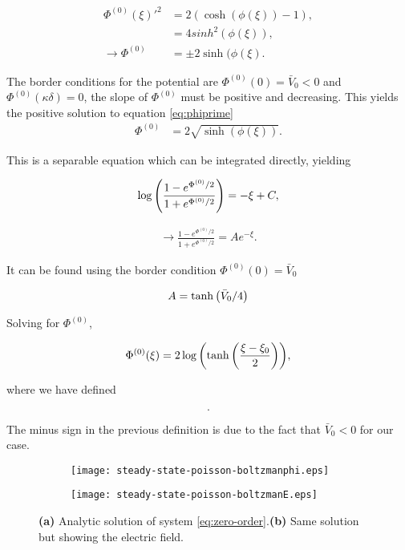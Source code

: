 \begin{align}
\Phi^{(0)}(\xi)'^2   &= 2(\cosh(\phi(\xi))-1),\\
&= 4sinh^2(\phi(\xi)), \\
\rightarrow \Phi^{(0)} &= \pm 2\sinh(\phi(\xi).
\label{eq:phiprime}
\end{align}


The border conditions for the potential are $\Phi^{(0)}(0) = \bar{V}_0<0$ and $\Phi^{(0)}(\kappa \delta) = 0$, the slope of $\Phi^{(0)}$ must be positive and decreasing. This yields the positive solution to equation \ref{eq:phiprime}
\begin{align}
\Phi^{(0)} &=  2\sqrt{\sinh(\phi(\xi))}.
\end{align}

This is a separable equation which can be integrated directly, yielding

\begin{align}
	\log\left({\frac{1-e^{\Phi^{(0)}/2}}{1+e^{\Phi^{(0)}/2}}}\right) = -\xi + C,
\end{align}

\begin{align}
	\rightarrow \frac{1-e^{\Phi^{(0)}/2}}{1+e^{\Phi^{(0)}/2}}= Ae^{-\xi}.
\end{align}

It can be found using the border condition $\Phi^{(0)}(0) = \bar{V}_0$

\begin{align}
A = \tanh\left({{\bar{V}_0/4}}\right)
\end{align}

Solving for $\Phi^{(0)}$,

\begin{align}
\Phi^{(0)}(\xi) =  2\log{ \left({\tanh \left({\frac{\xi-\xi_0}{2}}\right) }\right) },
\label{eq:pot0}
\end{align}

where we have defined

$$.$$

The minus sign in the previous definition is due to the fact that $\bar{V}_0 < 0$ for our case.


\begin{figure}[htbp!]
\centering
\begin{subfigure}{.4\textwidth}
  \centering
  \texttt{[image: steady-state-poisson-boltzmanphi.eps]}
  \caption{}
  \label{fig:sub1}
\end{subfigure}%
\begin{subfigure}{.4\textwidth}
  \centering
  \texttt{[image: steady-state-poisson-boltzmanE.eps]}
  \caption{}
  \label{fig:sub2}
\end{subfigure}
\caption{\textbf{(a)} Analytic solution of system \ref{eq:zero-order}.\textbf{(b)} Same solution but showing the electric field.}
\label{fig:test}
\end{figure}




